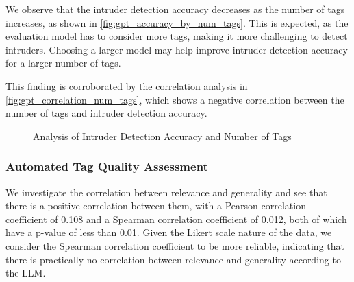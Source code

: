 We observe that the intruder detection accuracy decreases as the number of tags increases, as shown in \cref{fig:gpt_accuracy_by_num_tags}. This is expected, as the evaluation model has to consider more tags, making it more challenging to detect intruders. Choosing a larger model may help improve intruder detection accuracy for a larger number of tags.

This finding is corroborated by the correlation analysis in \cref{fig:gpt_correlation_num_tags}, which shows a negative correlation between the number of tags and intruder detection accuracy.

\begin{figure}[h]
    \centering
    \hfill
    \caption{Analysis of Intruder Detection Accuracy and Number of Tags}
    \label{fig:gpt_num_tags_analysis}
\end{figure}

\subsubsection{Automated Tag Quality Assessment}
We investigate the correlation between relevance and generality and see that there is a positive correlation between them, with a Pearson correlation coefficient of 0.108 and a Spearman correlation coefficient of 0.012, both of which have a p-value of less than 0.01. Given the Likert scale nature of the data, we consider the Spearman correlation coefficient to be more reliable, indicating that there is practically no correlation between relevance and generality according to the LLM.

